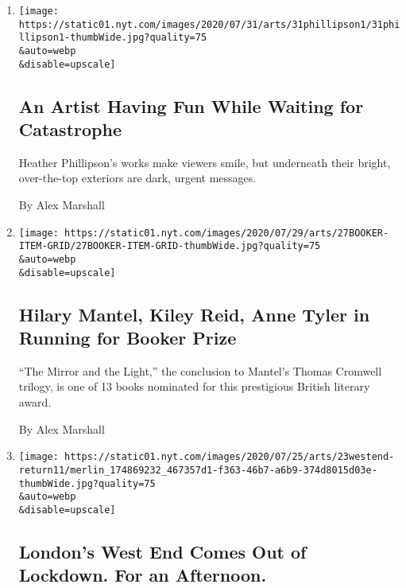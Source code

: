 \begin{enumerate}
\def\labelenumi{\arabic{enumi}.}
\item
  \href{/2020/07/31/arts/design/heather-phillipson-fourth-plinth.html}{}

  \texttt{[image: https://static01.nyt.com/images/2020/07/31/arts/31phillipson1/31phillipson1-thumbWide.jpg?quality=75\\\&auto=webp\\\&disable=upscale]}

  \hypertarget{an-artist-having-fun-while-waiting-for-catastrophe}{%
  \subsection{An Artist Having Fun While Waiting for
  Catastrophe}\label{an-artist-having-fun-while-waiting-for-catastrophe}}

  Heather Phillipson's works make viewers smile, but underneath their
  bright, over-the-top exteriors are dark, urgent messages.

  By Alex Marshall
\item
  \href{/2020/07/27/books/hilary-mantel-booker-prize-longlist.html}{}

  \texttt{[image: https://static01.nyt.com/images/2020/07/29/arts/27BOOKER-ITEM-GRID/27BOOKER-ITEM-GRID-thumbWide.jpg?quality=75\\\&auto=webp\\\&disable=upscale]}

  \hypertarget{hilary-mantel-kiley-reid-anne-tyler-in-running-for-booker-prize}{%
  \subsection{Hilary Mantel, Kiley Reid, Anne Tyler in Running for
  Booker
  Prize}\label{hilary-mantel-kiley-reid-anne-tyler-in-running-for-booker-prize}}

  ``The Mirror and the Light,'' the conclusion to Mantel's Thomas
  Cromwell trilogy, is one of 13 books nominated for this prestigious
  British literary award.

  By Alex Marshall
\item
  \href{/2020/07/23/theater/west-end-london-virus.html}{}

  \texttt{[image: https://static01.nyt.com/images/2020/07/25/arts/23westend-return11/merlin\_174869232\_467357d1-f363-46b7-a6b9-374d8015d03e-thumbWide.jpg?quality=75\\\&auto=webp\\\&disable=upscale]}

  \hypertarget{londons-west-end-comes-out-of-lockdown-for-an-afternoon}{%
  \subsection{London's West End Comes Out of Lockdown. For an
  Afternoon.}\label{londons-west-end-comes-out-of-lockdown-for-an-afternoon}}


\end{enumerate}
